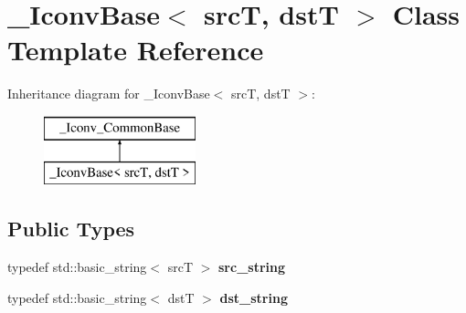 \hypertarget{class__IconvBase}{\section{\-\_\-\-Iconv\-Base$<$ src\-T, dst\-T $>$ Class Template Reference}
\label{class__IconvBase}
}
Inheritance diagram for \-\_\-\-Iconv\-Base$<$ src\-T, dst\-T $>$\-:\begin{figure}[H]
\begin{center}
\leavevmode
\includegraphics[height=2.000000cm]{class__IconvBase}
\end{center}
\end{figure}
\subsection*{Public Types}
\begin{DoxyCompactItemize}
\item 
\hypertarget{class__IconvBase_ad2246cfd9c3024b0cea9cd951e1ec16f}{typedef std\-::basic\-\_\-string$<$ src\-T $>$ {\bfseries src\-\_\-string}}\label{class__IconvBase_ad2246cfd9c3024b0cea9cd951e1ec16f}

\item 
\hypertarget{class__IconvBase_a6780fadf8fe4b1f828c4e431937d788e}{typedef std\-::basic\-\_\-string$<$ dst\-T $>$ {\bfseries dst\-\_\-string}}\label{class__IconvBase_a6780fadf8fe4b1f828c4e431937d788e}

\end{DoxyCompactItemize}

